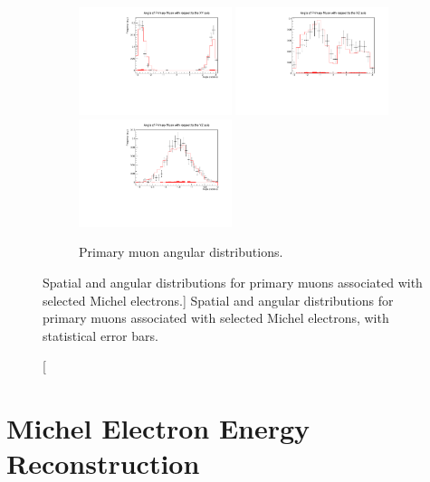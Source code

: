 \begin{figure}
	\begin{subfigure}[b]{\textwidth}
		\centering
		\vspace{1cm}
		\includegraphics[width=0.49\textwidth]{figures/DataVMC_angle_xy.pdf}
		\hfill
		\includegraphics[width=0.49\textwidth]{figures/DataVMC_angle_xz.pdf}
		\includegraphics[width=0.49\textwidth]{figures/DataVMC_angle_yz.pdf}
		\caption {Primary muon angular distributions.}
		\label{fig:muon_angles}
	\end{subfigure}
	

	\caption
	[Spatial and angular distributions for primary muons associated with selected
	Michel electrons.]
	{Spatial and angular distributions for primary muons associated with selected
	Michel electrons, with statistical error bars.}

	\label{fig:muon_distributions}

\end{figure}

\section{Michel Electron Energy Reconstruction} \label{ME_R} 

